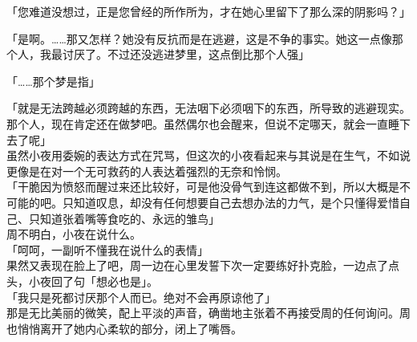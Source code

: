 「您难道没想过，正是您曾经的所作所为，才在她心里留下了那么深的阴影吗？」

「是啊。……那又怎样？她没有反抗而是在逃避，这是不争的事实。她这一点像那个人，我最讨厌了。不过还没逃进梦里，这点倒比那个人强」

「……那个梦是指」

「就是无法跨越必须跨越的东西，无法咽下必须咽下的东西，所导致的逃避现实。那个人，现在肯定还在做梦吧。虽然偶尔也会醒来，但说不定哪天，就会一直睡下去了呢」\\

虽然小夜用委婉的表达方式在咒骂，但这次的小夜看起来与其说是在生气，不如说更像是在对一个无可救药的人表达着强烈的无奈和怜悯。\\

「干脆因为愤怒而醒过来还比较好，可是他没骨气到连这都做不到，所以大概是不可能的吧。只知道叹息，却没有任何想要自己去想办法的力气，是个只懂得爱惜自己、只知道张着嘴等食吃的、永远的雏鸟」\\

周不明白，小夜在说什么。\\

「呵呵，一副听不懂我在说什么的表情」\\

果然又表现在脸上了吧，周一边在心里发誓下次一定要练好扑克脸，一边点了点头，小夜回了句「想必也是」。\\

「我只是死都讨厌那个人而已。绝对不会再原谅他了」\\

那是无比美丽的微笑，配上平淡的声音，确凿地主张着不再接受周的任何询问。周也悄悄离开了她内心柔软的部分，闭上了嘴唇。
